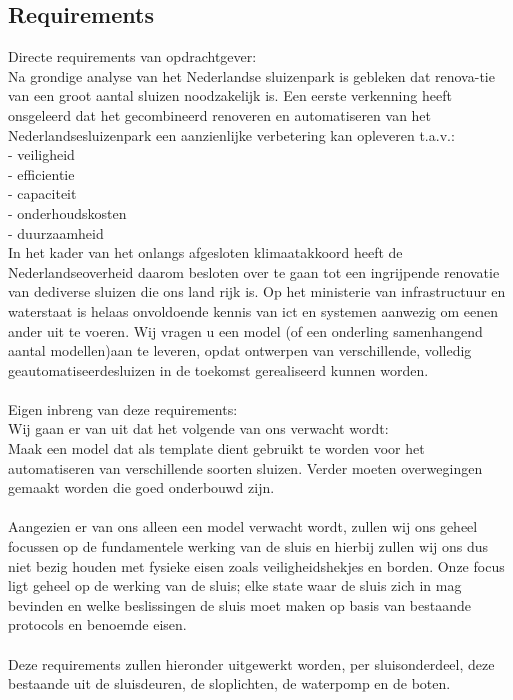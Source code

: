 \documentclass{article}
\begin{document}
	\subsection{Requirements}
	Directe requirements van opdrachtgever:\\
	Na grondige analyse van het Nederlandse sluizenpark is gebleken dat renova-tie van een groot aantal sluizen noodzakelijk is.  Een eerste verkenning heeft onsgeleerd dat het gecombineerd renoveren en automatiseren van het Nederlandsesluizenpark een aanzienlijke verbetering kan opleveren t.a.v.:\\
	- veiligheid\\
	- efficientie\\
	- capaciteit\\
	- onderhoudskosten\\
	- duurzaamheid\\
	In het kader van het onlangs afgesloten klimaatakkoord heeft de Nederlandseoverheid  daarom  besloten  over te gaan tot een ingrijpende renovatie van dediverse sluizen die ons land rijk is. Op het ministerie van infrastructuur en waterstaat is helaas onvoldoende kennis van ict en systemen aanwezig om eenen ander uit te voeren. Wij vragen u een model (of een onderling samenhangend aantal modellen)aan  te leveren, opdat ontwerpen van verschillende, volledig geautomatiseerdesluizen in de toekomst gerealiseerd kunnen worden.\\\\
	Eigen inbreng van deze requirements:\\
	Wij gaan er van uit dat het volgende van ons verwacht wordt:\\
	Maak een model dat als template dient gebruikt te worden voor het automatiseren van verschillende soorten sluizen. Verder moeten overwegingen gemaakt worden die goed onderbouwd zijn.\\\\ Aangezien er van ons alleen een model verwacht wordt, zullen wij ons geheel focussen op de fundamentele werking van de sluis en hierbij zullen wij ons dus niet bezig  houden met fysieke eisen zoals veiligheidshekjes en borden. Onze focus ligt geheel op de werking van de sluis; elke state waar de sluis zich in mag bevinden en welke beslissingen de sluis moet maken op basis van bestaande protocols en benoemde eisen. \\\\
	Deze requirements zullen hieronder uitgewerkt worden, per sluisonderdeel, deze bestaande uit de sluisdeuren, de sloplichten, de waterpomp en de boten.\\
	
\end{document}
